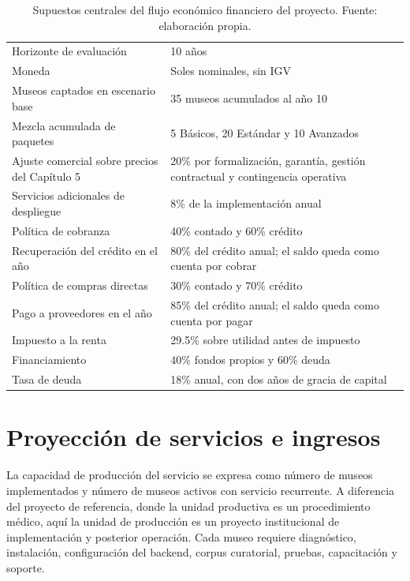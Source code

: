 \begin{table}[H]
	\centering
	\footnotesize
	\mqiTableSetup
	\begin{tabular}{|p{8.2cm}|p{5.2cm}|}
		\hline
		\mqiTitle{2}{SUPUESTOS CENTRALES DEL FLUJO}
		\mqiHead \mqiWhite{Supuesto} & \mqiWhite{Valor adoptado} \\ \hline
		\mqiA Horizonte de evaluación & 10 años \\ \hline
		\mqiB Moneda & Soles nominales, sin IGV \\ \hline
		\mqiA Museos captados en escenario base & 35 museos acumulados al año 10 \\ \hline
		\mqiB Mezcla acumulada de paquetes & 5 Básicos, 20 Estándar y 10 Avanzados \\ \hline
		\mqiA Ajuste comercial sobre precios del Capítulo 5 & 20\% por formalización, garantía, gestión contractual y contingencia operativa \\ \hline
		\mqiB Servicios adicionales de despliegue & 8\% de la implementación anual \\ \hline
		\mqiA Política de cobranza & 40\% contado y 60\% crédito \\ \hline
		\mqiB Recuperación del crédito en el año & 80\% del crédito anual; el saldo queda como cuenta por cobrar \\ \hline
		\mqiA Política de compras directas & 30\% contado y 70\% crédito \\ \hline
		\mqiB Pago a proveedores en el año & 85\% del crédito anual; el saldo queda como cuenta por pagar \\ \hline
		\mqiA Impuesto a la renta & 29.5\% sobre utilidad antes de impuesto \\ \hline
		\mqiB Financiamiento & 40\% fondos propios y 60\% deuda \\ \hline
		\mqiA Tasa de deuda & 18\% anual, con dos años de gracia de capital \\ \hline
	\end{tabular}
	\caption[Supuestos centrales del flujo del proyecto]{Supuestos centrales del flujo económico financiero del proyecto. Fuente: elaboración propia.}
	\label{tab:supuestos-flujo-proyecto}
\end{table}

\section{Proyección de servicios e ingresos}

La capacidad de producción del servicio se expresa como número de museos implementados y número de museos activos con servicio recurrente. A diferencia del proyecto de referencia, donde la unidad productiva es un procedimiento médico, aquí la unidad de producción es un proyecto institucional de implementación y posterior operación. Cada museo requiere diagnóstico, instalación, configuración del backend, corpus curatorial, pruebas, capacitación y soporte.

